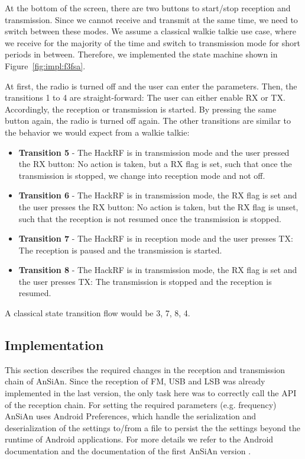 At the bottom of the screen, there are two buttons to start/stop reception and transmission. Since we cannot receive and transmit at the same time, we need to switch between these modes. We assume a classical walkie talkie use case, where we receive for the majority of the time and switch to transmission mode for short periods in between. Therefore, we implemented the state machine shown in Figure~\ref{fig:impl:f3fsa}. 

At first, the radio is turned off and the user can enter the parameters. Then, the transitions 1 to 4 are straight-forward:  The user can either enable RX or TX. Accordingly, the reception or transmission is started. By pressing the same button again, the radio is turned off again. The other transitions are similar to the behavior we would expect from a walkie talkie: 
\begin{itemize}
	\item \textbf{Transition 5} - The HackRF is in transmission mode and the user pressed the RX button: No action is taken, but a RX flag is set, such that once the transmission is stopped, we change into reception mode and not off. 
	\item \textbf{Transition 6} - The HackRF is in transmission mode, the RX flag is set and the user presses the RX button: No action is taken, but the RX flag is unset, such that the reception is not resumed once the transmission is stopped. 
	\item \textbf{Transition 7} - The HackRF is in reception mode and the user presses TX: The reception is paused and the transmission is started. 
	\item \textbf{Transition 8} - The HackRF is in transmission mode, the RX flag is set and the user presses TX: The transmission is stopped and the reception is resumed. 
\end{itemize}

A classical state transition flow would be 3, 7, 8, 4. 
\subsection{Implementation}

This section describes the required changes in the reception and transmission chain of AnSiAn. 
Since the reception of FM, USB and LSB was already implemented in the last version, the only task here was to correctly call the API of the reception chain. For setting the required parameters (e.g. frequency) AnSiAn uses Android Preferences, which handle the serialization and deserialization of the settings to/from a file to persist the the settings beyond the runtime of Android applications. For more details we refer to the Android documentation \cite{androidpref} and the documentation of the first AnSiAn version \cite{Kreis2015}.

